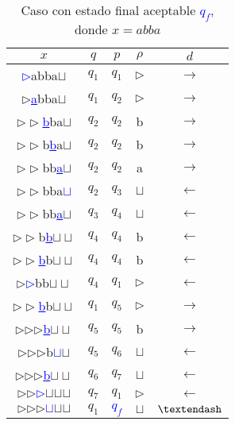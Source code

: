 \documentclass[letterpaper,11pt]{article}
\begin{document}
\break
\begin{table}[h!]
\centering
\begin{tabular}{c|c|c|c|c}
\hline
$x$ & $q$ & $p$ & $\rho$ & $d$ \\ \hline
\textcolor{blue}{\underline{$\rhd$}}abba$\sqcup$  & $q_1$ & $q_1$ & $\rhd$ & $\rightarrow$  \\
$\rhd$\textcolor{blue}{\underline{a}}bba$\sqcup$  & $q_1$ & $q_2$ & $\rhd$ & $\rightarrow$  \\
$\rhd\rhd$\textcolor{blue}{\underline{b}}ba$\sqcup$  & $q_2$ & $q_2$ & b & $\rightarrow$  \\
$\rhd\rhd$b\textcolor{blue}{\underline{b}}a$\sqcup$  & $q_2$ & $q_2$ & b & $\rightarrow$  \\
$\rhd\rhd$bb\textcolor{blue}{\underline{a}}$\sqcup$  & $q_2$ & $q_2$ & a & $\rightarrow$  \\
$\rhd\rhd$bba\textcolor{blue}{\underline{$\sqcup$}}  & $q_2$ & $q_3$ & $\sqcup$ & $\leftarrow$  \\
$\rhd\rhd$bb\textcolor{blue}{\underline{a}}$\sqcup$  & $q_3$ & $q_4$ & $\sqcup$ & $\leftarrow$  \\
$\rhd\rhd$b\textcolor{blue}{\underline{b}}$\sqcup\sqcup$  & $q_4$ & $q_4$ & b & $\leftarrow$  \\
$\rhd\rhd$\textcolor{blue}{\underline{b}}b$\sqcup\sqcup$  & $q_4$ & $q_4$ & b & $\leftarrow$  \\
$\rhd$\textcolor{blue}{\underline{$\rhd$}}bb$\sqcup\sqcup$  & $q_4$ & $q_1$ & $\rhd$ & $\leftarrow$  \\
$\rhd\rhd$\textcolor{blue}{\underline{b}}b$\sqcup\sqcup$  & $q_1$ & $q_5$ & $\rhd$ & $\rightarrow$  \\
$\rhd$$\rhd$$\rhd$\textcolor{blue}{\underline{b}}$\sqcup\sqcup$  & $q_5$ & $q_5$ & b & $\rightarrow$  \\
$\rhd$$\rhd$$\rhd$b\textcolor{blue}{\underline{$\sqcup$}}$\sqcup$  & $q_5$ & $q_6$ & $\sqcup$ & $\leftarrow$  \\
$\rhd$$\rhd$$\rhd$\textcolor{blue}{\underline{b}}$\sqcup\sqcup$  & $q_6$ & $q_7$ & $\sqcup$ & $\leftarrow$  \\
$\rhd$$\rhd$\textcolor{blue}{\underline{$\rhd$}}$\sqcup$$\sqcup$$\sqcup$  & $q_7$ & $q_1$ & $\rhd$ & $\leftarrow$  \\
$\rhd$$\rhd$$\rhd$\textcolor{blue}{\underline{$\sqcup$}}$\sqcup$$\sqcup$  & $q_1$ & \textcolor{blue}{$q_f$} & $\sqcup$ & $\textendash$  \\\hline
\end{tabular}
\caption{Caso con estado final aceptable \textcolor{blue}{$q_f$}, donde $x=abba$}
\end{table}
\end{document}
